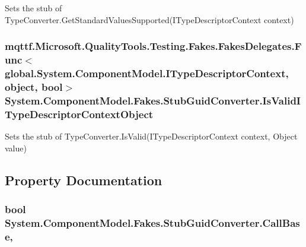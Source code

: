 Sets the stub of Type\-Converter.\-Get\-Standard\-Values\-Supported(\-I\-Type\-Descriptor\-Context context)

\hypertarget{class_system_1_1_component_model_1_1_fakes_1_1_stub_guid_converter_a58126c75e58e163ceef8c500be3c3be1}{
\subsubsection[{Is\-Valid\-I\-Type\-Descriptor\-Context\-Object}]{\setlength{\rightskip}{0pt plus 5cm}mqttf.\-Microsoft.\-Quality\-Tools.\-Testing.\-Fakes.\-Fakes\-Delegates.\-Func$<$global.\-System.\-Component\-Model.\-I\-Type\-Descriptor\-Context, object, bool$>$ System.\-Component\-Model.\-Fakes.\-Stub\-Guid\-Converter.\-Is\-Valid\-I\-Type\-Descriptor\-Context\-Object}}\label{class_system_1_1_component_model_1_1_fakes_1_1_stub_guid_converter_a58126c75e58e163ceef8c500be3c3be1}


Sets the stub of Type\-Converter.\-Is\-Valid(\-I\-Type\-Descriptor\-Context context, Object value)



\subsection{Property Documentation}
\hypertarget{class_system_1_1_component_model_1_1_fakes_1_1_stub_guid_converter_abd96819b074230bb44eba7bff9476c5d}{
\subsubsection[{Call\-Base}]{\setlength{\rightskip}{0pt plus 5cm}bool System.\-Component\-Model.\-Fakes.\-Stub\-Guid\-Converter.\-Call\-Base\hspace{0.3cm}{\ttfamily [get]}, {\ttfamily [set]}}}\label{class_system_1_1_component_model_1_1_fakes_1_1_stub_guid_converter_abd96819b074230bb44eba7bff9476c5d}


